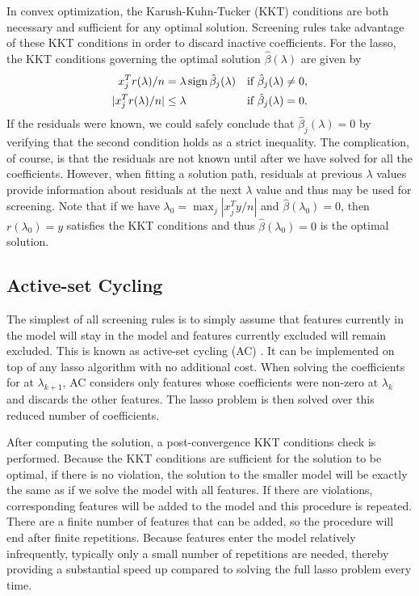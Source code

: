 In convex optimization, the Karush-Kuhn-Tucker (KKT) conditions are both necessary and sufficient for any optimal solution.  Screening rules take advantage of these KKT conditions in order to discard inactive coefficients.  For the lasso, the KKT conditions governing the optimal solution $\hat{\beta}(\lambda)$ are given by
\begin{equation}
  \label{eq:kkt}
  \begin{aligned}
    x_j^Tr(\lambda)/n &= \lambda \, \textrm{sign} \, \hat{\beta}_j(\lambda) & & \textrm{if } \hat{\beta}_j(\lambda)\neq 0,\\
    |x_j^Tr(\lambda)/n| &\leq \lambda & & \textrm{if } \hat{\beta}_j(\lambda)= 0.
  \end{aligned}
\end{equation}
If the residuals were known, we could safely conclude that $\hat{\beta}_j(\lambda)=0$ by verifying that the second condition holds as a strict inequality.  The complication, of course, is that the residuals are not known until after we have solved for all the coefficients.  However, when fitting a solution path, residuals at previous $\lambda$ values provide information about residuals at the next $\lambda$ value and thus may be used for screening. Note that if we have $\lambda_0=\max_j|x_j^Ty/n|$ and $\hat{\beta}(\lambda_0)=0$, then $r(\lambda_0)=y$ satisfies the KKT conditions and thus $\hat{\beta}(\lambda_0)=0$ is the optimal solution.

\subsection{Active-set Cycling}
\label{sec:active}

The simplest of all screening rules is to simply assume that features currently in the model will stay in the model and features currently excluded will remain excluded.  This is known as active-set cycling (AC) \citep{lee2007efficient}. It can be implemented on top of any lasso algorithm with no additional cost. When solving the coefficients for at $\lambda_{k+1}$, AC considers only features whose coefficients were non-zero at $\lambda_k$ and discards the other features. The lasso problem is then solved over this reduced number of coefficients.

After computing the solution, a post-convergence KKT conditions check is performed. Because the KKT conditions are sufficient for the solution to be optimal, if there is no violation, the solution to the smaller model will be exactly the same as if we solve the model with all features. If there are violations, corresponding features will be added to the model and this procedure is repeated. There are a finite number of features that can be added, so the procedure will end after finite repetitions. Because features enter the model relatively infrequently, typically only a small number of repetitions are needed, thereby providing a substantial speed up compared to solving the full lasso problem every time.

